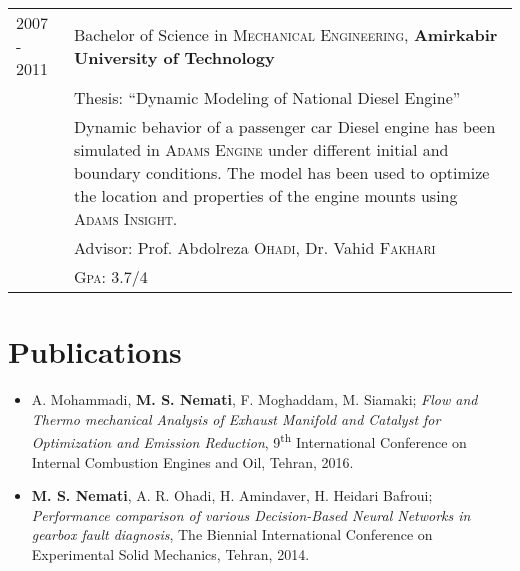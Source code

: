 \documentclass[a4paper,9pt]{article}
\begin{document}
\begin{tabular}{p{1.7cm}|p{13.3cm}}
2007 - 2011 & Bachelor of Science in \textsc{Mechanical Engineering}, \textbf{Amirkabir University of Technology}\\
& Thesis: ``Dynamic Modeling of National Diesel Engine''\\
& \footnotesize{Dynamic behavior of a passenger car Diesel engine has been simulated in \textsc{Adams Engine} under different initial and boundary conditions. The model has been used to optimize the location and properties of the engine mounts using \textsc{Adams Insight}}.\\
&\small Advisor: Prof. Abdolreza \textsc{Ohadi}, Dr. Vahid \textsc{Fakhari}\\
&\normalsize \textsc{Gpa}: 3.7/4\\
\end{tabular}


\section*{Publications}


\begin{itemize}

\item  A. Mohammadi, \textbf{M. S. Nemati}, F. Moghaddam, M. Siamaki; \emph{Flow and Thermo mechanical Analysis of Exhaust Manifold and Catalyst for Optimization and Emission Reduction}, 9\textsuperscript{th} International Conference on Internal Combustion Engines and Oil, Tehran, 2016.

\item  \textbf{M. S. Nemati}, A. R. Ohadi, H. Amindaver, H. Heidari Bafroui; \emph{Performance comparison of various Decision-Based Neural Networks in
gearbox fault diagnosis}, The Biennial International Conference on Experimental Solid Mechanics, Tehran, 2014.

\end{itemize}

\end{document}
